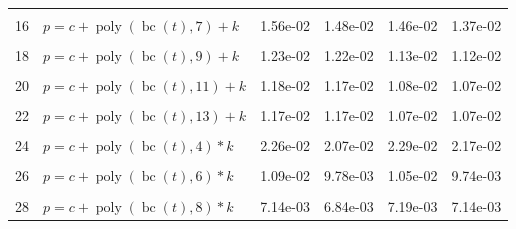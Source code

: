 \documentclass[12pt,a4paper]{article}
\DeclareMathOperator{\bc}{bc}
\DeclareMathOperator{\poly}{poly}
\begin{document}
\begin{longtable}[t]{ll>{\raggedleft\arraybackslash}p{2cm}>{\raggedleft\arraybackslash}p{2cm}>{\raggedleft\arraybackslash}p{2cm}>{\raggedleft\arraybackslash}p{2cm}}
\cellcolor{gray!6}{15} & \cellcolor{gray!6}{$p = c + \poly\left( \bc(t), 6 \right) + k$} & \cellcolor{gray!6}{1.63e-02} & \cellcolor{gray!6}{1.52e-02} & \cellcolor{gray!6}{1.38e-02} & \cellcolor{gray!6}{1.35e-02}\\
16 & $p = c + \poly\left( \bc(t), 7 \right) + k$ & 1.56e-02 & 1.48e-02 & 1.46e-02 & 1.37e-02\\
\cellcolor{gray!6}{17} & \cellcolor{gray!6}{$p = c + \poly\left( \bc(t), 8 \right) + k$} & \cellcolor{gray!6}{1.26e-02} & \cellcolor{gray!6}{1.23e-02} & \cellcolor{gray!6}{1.12e-02} & \cellcolor{gray!6}{1.11e-02}\\
18 & $p = c + \poly\left( \bc(t), 9 \right) + k$ & 1.23e-02 & 1.22e-02 & 1.13e-02 & 1.12e-02\\
\cellcolor{gray!6}{19} & \cellcolor{gray!6}{$p = c + \poly\left( \bc(t), 10 \right) + k$} & \cellcolor{gray!6}{1.21e-02} & \cellcolor{gray!6}{1.20e-02} & \cellcolor{gray!6}{1.10e-02} & \cellcolor{gray!6}{1.09e-02}\\
20 & $p = c + \poly\left( \bc(t), 11 \right) + k$ & 1.18e-02 & 1.17e-02 & 1.08e-02 & 1.07e-02\\
\cellcolor{gray!6}{21} & \cellcolor{gray!6}{$p = c + \poly\left( \bc(t), 12 \right) + k$} & \cellcolor{gray!6}{1.17e-02} & \cellcolor{gray!6}{1.17e-02} & \cellcolor{gray!6}{1.07e-02} & \cellcolor{gray!6}{1.07e-02}\\
22 & $p = c + \poly\left( \bc(t), 13 \right) + k$ & 1.17e-02 & 1.17e-02 & 1.07e-02 & 1.07e-02\\
\cellcolor{gray!6}{23} & \cellcolor{gray!6}{$p = c + \poly\left( \bc(t), 3 \right) * k$} & \cellcolor{gray!6}{2.82e-02} & \cellcolor{gray!6}{1.97e-02} & \cellcolor{gray!6}{2.06e-02} & \cellcolor{gray!6}{1.94e-02}\\
24 & $p = c + \poly\left( \bc(t), 4 \right) * k$ & 2.26e-02 & 2.07e-02 & 2.29e-02 & 2.17e-02\\
\cellcolor{gray!6}{25} & \cellcolor{gray!6}{$p = c + \poly\left( \bc(t), 5 \right) * k$} & \cellcolor{gray!6}{1.79e-02} & \cellcolor{gray!6}{1.71e-02} & \cellcolor{gray!6}{1.50e-02} & \cellcolor{gray!6}{1.47e-02}\\
26 & $p = c + \poly\left( \bc(t), 6 \right) * k$ & 1.09e-02 & 9.78e-03 & 1.05e-02 & 9.74e-03\\
\cellcolor{gray!6}{27} & \cellcolor{gray!6}{$p = c + \poly\left( \bc(t), 7 \right) * k$} & \cellcolor{gray!6}{9.84e-03} & \cellcolor{gray!6}{8.83e-03} & \cellcolor{gray!6}{9.58e-03} & \cellcolor{gray!6}{9.00e-03}\\
28 & $p = c + \poly\left( \bc(t), 8 \right) * k$ & 7.14e-03 & 6.84e-03 & 7.19e-03 & 7.14e-03\\

\end{longtable}
\end{document}
